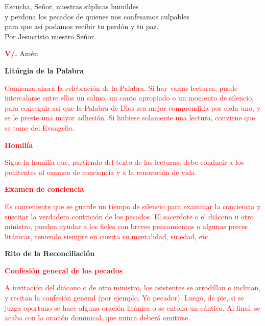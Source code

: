 \documentclass[12pt, letterpaper]{report}
\begin{document}
\noindent
\Large {Escucha, Se\~nor, nuestras s\'uplicas humildes\\
y perdona los pecados de quienes nos confesamos culpables\\
para que as\'i podamos recibir tu perd\'on y tu paz.\\
Por Jesucristo nuestro Se\~nor.}

\noindent
\Large {\bfseries \textcolor{red}{V/.}} \hspace{1cm} Am\'en

\begin{center}
\Huge {\bfseries Lit\'urgia de la Palabra}
\end{center}

\large {\textcolor{red}{Comienza ahora la celebraci\'on de la Palabra. Si hay varias lecturas, puede intercalarse entre ellas un salmo, un canto apropiado o un momento de silencio, para conseguir as\'i que la Palabra de Dios sea mejor comprendida por cada uno, y se le preste una mayor adhesi\'on. Si hubiese solamente una lectura, conviene que se tome del Evangelio.}}

\Large {\bfseries \textcolor{red}{Homil\'ia}}

\large {\textcolor{red}{Sigue la homil\'ia que, partiendo del texto de las lecturas, debe conducir a los penitentes al examen de conciencia y a la renovaci\'on de vida.}}

\Large {\bfseries \textcolor{red}{Examen de conciencia}}

\large {\textcolor{red}{Es conveniente que se guarde un tiempo de silencio para examinar la conciencia y suscitar la verdadera contrici\'on de los pecados. El sacerdote o el di\'acono u otro ministro, pueden ayudar a los fieles con breves pensamientos o algunas preces lit\'anicas, teniendo siempre en cuenta su mentalidad, su edad, etc.}}

\newpage

\begin{center}
\Huge {\bfseries Rito de la Reconciliaci\'on}
\end{center}

\Large {\bfseries \textcolor{red}{Confesi\'on general de los pecados}} 

\large {\textcolor{red}{A invitaci\'on del di\'acono o de otro ministro, los asistentes se arrodillan o inclinan, y recitan la confesi\'on general (por ejemplo, Yo pecador). Luego, de pie, si se juzga oportuno se hace alguna oraci\'on lit\'anica o se entona un c\'antico. Al final, se acaba con la oraci\'on dominical, que nunca deber\'a omitirse.}} 
\end{document}
